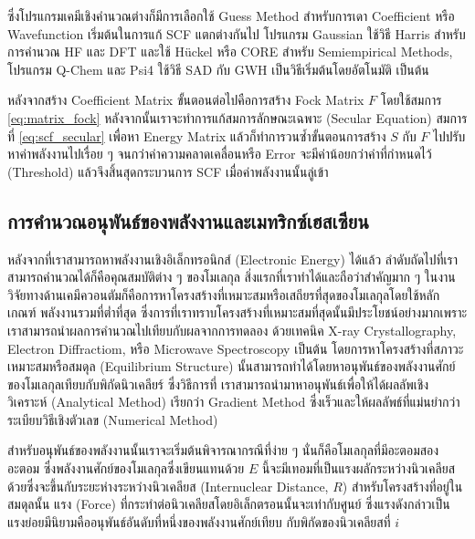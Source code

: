 ซึ่งโปรแกรมเคมีเชิงคำนวณต่างก็มีการเลือกใช้ Guess Method สำหรับการเดา Coefficient หรือ Wavefunction เริ่มต้นในการแก้ SCF แตกต่างกันไป
โปรแกรม Gaussian ใช้วิธี Harris สำหรับการคำนวณ HF และ DFT และใช้ H{\"u}ckel หรือ CORE สำหรับ Semiempirical Methods, 
โปรแกรม Q-Chem และ Psi4 ใช้วิธี SAD กับ GWH เป็นวิธีเริ่มต้นโดยอัตโนมัติ เป็นต้น

หลังจากสร้าง Coefficient Matrix ขั้นตอนต่อไปคือการสร้าง Fock Matrix $F$ โดยใช้สมการ \ref{eq:matrix_fock} 
หลังจากนั้นเราจะทำการแก้สมการลักษณะเฉพาะ (Secular Equation) สมการที่ \ref{eq:scf_secular} เพื่อหา Energy Matrix 
แล้วก็ทำการวนซ้ำขั้นตอนการสร้าง $S$ กับ $F$ ไปปรับหาค่าพลังงานไปเรื่อย ๆ จนกว่าค่าความคลาดเคลื่อนหรือ Error จะมีค่าน้อยกว่าค่าที่กำหนดไว้ 
(Threshold) แล้วจึงสิ้นสุดกระบวนการ SCF เมื่อค่าพลังงานนั้นลู่เข้า

\subsection{การคำนวณอนุพันธ์ของพลังงานและเมทริกซ์เฮสเซียน}
\label{ssec:ener_der}

หลังจากที่เราสามารถหาพลังงานเชิงอิเล็กทรอนิกส์ (Electronic Energy) ได้แล้ว ลำดับถัดไปที่เราสามารถคำนวณได้ก็คือคุณสมบัติต่าง ๆ ของโมเลกุล
สิ่งแรกที่เราทำได้และถือว่าสำคัญมาก ๆ ในงานวิจัยทางด้านเคมีควอนตัมก็คือการหาโครงสร้างที่เหมาะสมหรือเสถียรที่สุดของโมเลกุลโดยใช้หลักเกณฑ์%
พลังงานรวมที่ต่ำที่สุด ซึ่งการที่เราทราบโครงสร้างที่เหมาะสมที่สุดนั้นมีประโยชน์อย่างมากเพราะเราสามารถนำผลการคำนวณไปเทียบกับผลจากการทดลอง%
ด้วยเทคนิค X-ray Crystallography, Electron Diffractiom, หรือ Microwave Spectroscopy เป็นต้น โดยการหาโครงสร้างที่สภาวะ%
เหมาะสมหรือสมดุล (Equilibrium Structure) นั้นสามารถทำได้โดยหาอนุพันธ์ของพลังงานศักย์ของโมเลกุลเทียบกับพิกัดนิวเคลียร์ ซึ่งวิธีการที่%
เราสามารถนำมาหาอนุพันธ์เพื่อให้ได้ผลลัพเชิงวิเคราะห์ (Analytical Method) เรียกว่า Gradient Method ซึ่งเร็วและให้ผลลัพธ์ที่แม่นยำกว่า%
ระเบียบวิธีเชิงตัวเลข (Numerical Method)

สำหรับอนุพันธ์ของพลังงานนั้นเราจะเริ่มต้นพิจารณากรณีที่ง่าย ๆ นั่นก็คือโมเลกุลที่มีอะตอมสองอะตอม ซึ่งพลังงานศักย์ของโมเลกุลซึ่งเขียนแทนด้วย $E$ 
นี้จะมีเทอมที่เป็นแรงผลักระหว่างนิวเคลียสด้วยซึ่งจะขึ้นกับระยะห่างระหว่างนิวเคลียส (Internuclear Distance, $R$) สำหรับโครงสร้างที่อยู่ในสมดุลนั้น 
แรง (Force) ที่กระทำต่อนิวเคลียสโดยอิเล็กตรอนนั้นจะเท่ากับศูนย์ ซึ่งแรงดังกล่าวเป็นแรงย่อยมีนิยามคืออนุพันธ์อันดับที่หนึ่งของพลังงานศักย์เทียบ%
กับพิกัดของนิวเคลียสที่ $i$

